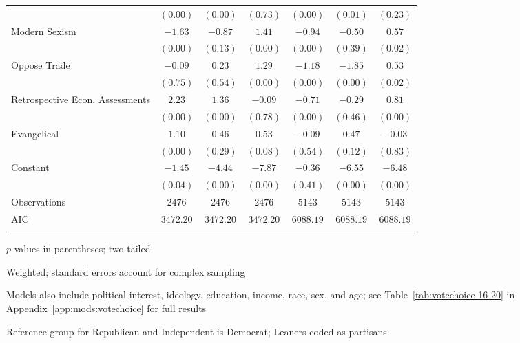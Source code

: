 \begin{table}[!t]
\begin{adjustbox}{width=0.8\textwidth,center}
\begin{threeparttable}
\begin{tabular}{lccc|ccc}
                                & $(0.00)$  & $(0.00)$  & $(0.73)$  & $(0.00)$  & $(0.01)$  & $(0.23)$  \\
Modern Sexism                   & $-1.63$   & $-0.87$   & $1.41$    & $-0.94$   & $-0.50$   & $0.57$    \\
                                & $(0.00)$  & $(0.13)$  & $(0.00)$  & $(0.00)$  & $(0.39)$  & $(0.02)$  \\
Oppose Trade                    & $-0.09$   & $0.23$    & $1.29$    & $-1.18$   & $-1.85$   & $0.53$    \\
                                & $(0.75)$  & $(0.54)$  & $(0.00)$  & $(0.00)$  & $(0.00)$  & $(0.02)$  \\
Retrospective Econ. Assessments & $2.23$    & $1.36$    & $-0.09$   & $-0.71$   & $-0.29$   & $0.81$    \\
                                & $(0.00)$  & $(0.00)$  & $(0.78)$  & $(0.00)$  & $(0.46)$  & $(0.00)$  \\
Evangelical                     & $1.10$    & $0.46$    & $0.53$    & $-0.09$   & $0.47$    & $-0.03$   \\
                                & $(0.00)$  & $(0.29)$  & $(0.08)$  & $(0.54)$  & $(0.12)$  & $(0.83)$  \\
Constant                        & $-1.45$   & $-4.44$   & $-7.87$   & $-0.36$   & $-6.55$   & $-6.48$   \\
                                & $(0.04)$  & $(0.00)$  & $(0.00)$  & $(0.41)$  & $(0.00)$  & $(0.00)$  \\
\hline
Observations                    & $2476$    & $2476$    & $2476$    & $5143$    & $5143$    & $5143$    \\
AIC                             & $3472.20$ & $3472.20$ & $3472.20$ & $6088.19$ & $6088.19$ & $6088.19$ \\
\hline 
\hline \\[-1.8ex] 
\end{tabular} 
\begin{tablenotes}[flushleft]
\linespread{1}
	\scriptsize
	\item \noindent $p$-values in parentheses; two-tailed
	\item \noindent Weighted; standard errors account for complex sampling
	\item \noindent Models also include political interest, ideology, education, income, race, sex, and age; see Table~\ref{tab:votechoice-16-20} in Appendix~\ref{app:mods:votechoice} for full results
	\item \noindent Reference group for Republican and Independent is Democrat; Leaners coded as partisans
\end{tablenotes}
\end{threeparttable}
\end{adjustbox}
\end{table}